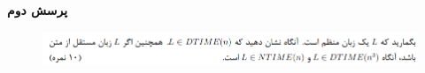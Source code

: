 \textbf{پرسش دوم}

\begin{figure}[H]
    \centering
    \includegraphics[scale=0.87]{questions/2.png}
\end{figure}
